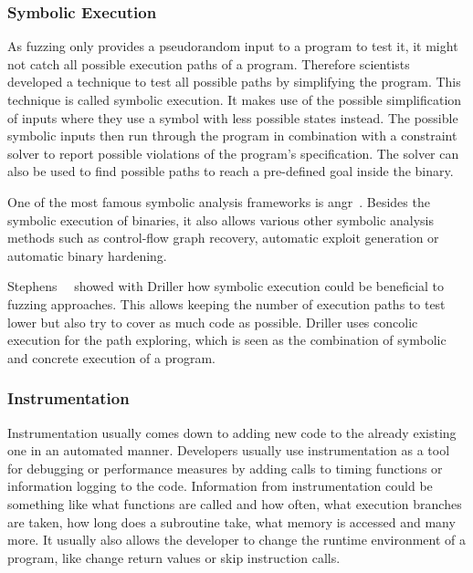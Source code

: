 \subsubsection{Symbolic Execution}

As fuzzing only provides a pseudorandom input to a program to test it, it might
not catch all possible execution paths of a program. Therefore scientists
developed a technique to test all possible paths by simplifying the program.
This technique is called symbolic execution. It makes use of the possible
simplification of inputs where they use a symbol with less possible states
instead. The possible symbolic inputs then run through the program in
combination with a constraint solver to report possible violations of the
program's specification. The solver can also be used to find possible paths to
reach a pre-defined goal inside the binary.

One of the most famous symbolic analysis frameworks is angr~\cite{angrpaper}.
Besides the symbolic execution of binaries, it also allows various other
symbolic analysis methods such as control-flow graph recovery, automatic exploit
generation or automatic binary hardening.

Stephens~\etal~\cite{driller} showed with Driller how symbolic execution could
be beneficial to fuzzing approaches. This allows keeping the number of execution
paths to test lower but also try to cover as much code as possible. Driller uses
concolic execution for the path exploring, which is seen as the combination of
symbolic and concrete execution of a program.

\subsubsection{Instrumentation}

Instrumentation usually comes down to adding new code to the already existing
one in an automated manner. Developers usually use instrumentation as a tool for
debugging or performance measures by adding calls to timing functions or
information logging to the code. Information from instrumentation could be
something like what functions are called and how often, what execution branches
are taken, how long does a subroutine take, what memory is accessed and many
more. It usually also allows the developer to change the runtime environment of
a program, like change return values or skip instruction calls.

